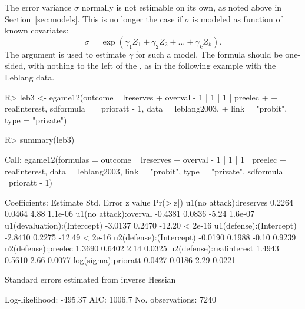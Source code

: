 \documentclass[article]{jss}
\begin{document}
The error variance $\sigma$ normally is not estimable on its own, as noted above
in Section~\ref{sec:models}.  This is no longer the case if $\sigma$ is modeled
as function of known covariates:
\begin{displaymath}
  \sigma = \exp(\gamma_1 Z_1 + \gamma_2 Z_2 + \ldots + \gamma_k Z_k).
\end{displaymath}
The argument  is used to estimate $\gamma$ for such a model.
The formula should be one-sided, with nothing to the left of the \code{~}, as in
the following example with the Leblang data.
\begin{Schunk}
\begin{Sinput}
R> leb3 <- egame12(outcome ~ lreserves + overval - 1 | 1 | 1 | preelec + 
+     realinterest, sdformula = ~prioratt - 1, data = leblang2003, 
+     link = "probit", type = "private")
\end{Sinput}
\end{Schunk}
\begin{Schunk}
\begin{Sinput}
R> summary(leb3)
\end{Sinput}
\begin{Soutput}
Call:
egame12(formulas = outcome ~ lreserves + overval - 1 | 1 | 1 | 
    preelec + realinterest, data = leblang2003, link = "probit", 
    type = "private", sdformula = ~prioratt - 1)

Coefficients:
                            Estimate Std. Error z value Pr(>|z|)
u1(no attack):lreserves       0.2264     0.0464    4.88  1.1e-06
u1(no attack):overval        -0.4381     0.0836   -5.24  1.6e-07
u1(devaluation):(Intercept)  -3.0137     0.2470  -12.20  < 2e-16
u1(defense):(Intercept)      -2.8410     0.2275  -12.49  < 2e-16
u2(defense):(Intercept)      -0.0190     0.1988   -0.10   0.9239
u2(defense):preelec           1.3690     0.6402    2.14   0.0325
u2(defense):realinterest      1.4943     0.5610    2.66   0.0077
log(sigma):prioratt           0.0427     0.0186    2.29   0.0221

Standard errors estimated from inverse Hessian

Log-likelihood: -495.37
AIC: 1006.7
No. observations: 7240 
\end{Soutput}
\end{Schunk}
\end{document}
